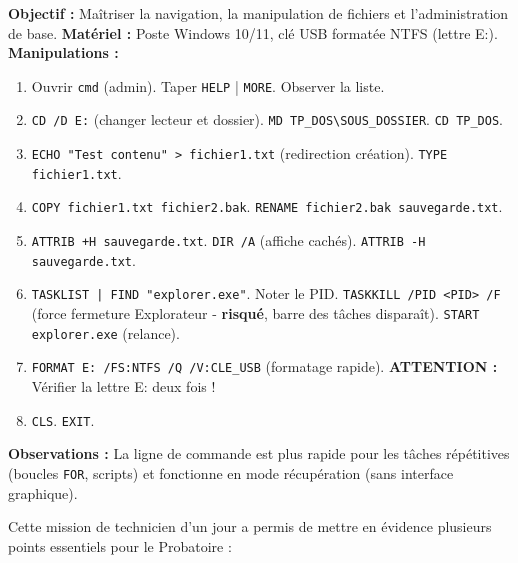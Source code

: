 \documentclass[11pt]{article}
\newcounter{popsec}
\newcounter{popsub}
\newcommand{\courssub}[1]{%
  \stepcounter{popsub}%
  \par\vspace{9pt}\noindent{\popxbold\fontsize{11.5}{13}\selectfont\color{popink}{\color{poporange}\thepopsec.\thepopsub}\hspace{6pt}#1}\par\nopagebreak\vspace{4pt}
}
\begin{document}
\begin{exoresolu}
\begin{experience}
\textbf{Objectif :} Maîtriser la navigation, la manipulation de fichiers et l'administration de base.
\textbf{Matériel :} Poste Windows 10/11, clé USB formatée NTFS (lettre E:).
\textbf{Manipulations :}
\begin{enumerate}
  \item Ouvrir \texttt{cmd} (admin). Taper \texttt{HELP} | \texttt{MORE}. Observer la liste.
  \item \texttt{CD /D E:} (changer lecteur et dossier). \texttt{MD TP\_DOS\textbackslash SOUS\_DOSSIER}. \texttt{CD TP\_DOS}.
  \item \texttt{ECHO "Test contenu" > fichier1.txt} (redirection création). \texttt{TYPE fichier1.txt}.
  \item \texttt{COPY fichier1.txt fichier2.bak}. \texttt{RENAME fichier2.bak sauvegarde.txt}.
  \item \texttt{ATTRIB +H sauvegarde.txt}. \texttt{DIR /A} (affiche cachés). \texttt{ATTRIB -H sauvegarde.txt}.
  \item \texttt{TASKLIST | FIND "explorer.exe"}. Noter le PID. \texttt{TASKKILL /PID <PID> /F} (force fermeture Explorateur - \textbf{risqué}, barre des tâches disparaît). \texttt{START explorer.exe} (relance).
  \item \texttt{FORMAT E: /FS:NTFS /Q /V:CLE\_USB} (formatage rapide). \textbf{ATTENTION :} Vérifier la lettre E: deux fois !
  \item \texttt{CLS}. \texttt{EXIT}.
\end{enumerate}
\textbf{Observations :} La ligne de commande est plus rapide pour les tâches répétitives (boucles \texttt{FOR}, scripts) et fonctionne en mode récupération (sans interface graphique).
\end{experience}
\end{exoresolu}

\courssub{Bilan de l'activité}

Cette mission de \og technicien d'un jour \fg{} a permis de mettre en évidence plusieurs points essentiels pour le Probatoire :
\end{document}
